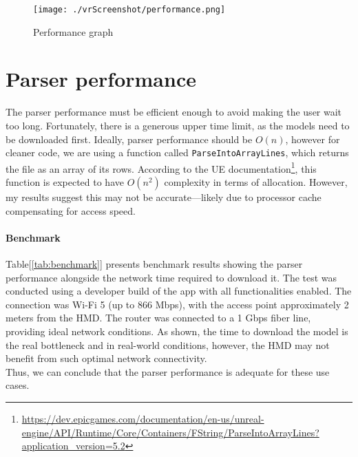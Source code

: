 \begin{figure}[ht]
  \centering
  \texttt{[image: ./vrScreenshot/performance.png]}
  \caption{Performance graph}
  \label{fig:performance}
\end{figure}

\section{Parser performance}\noindent
The parser performance must be efficient enough to avoid making the user wait too long. Fortunately, there is a generous upper time limit, as the models need to be downloaded first.
Ideally, parser performance should be $O(n)$, however for cleaner code, we are using a function called \texttt{ParseIntoArrayLines}, which returns the file as an array of its rows.
According to the \ac{UE} documentation\footnote{\url{https://dev.epicgames.com/documentation/en-us/unreal-engine/API/Runtime/Core/Containers/FString/ParseIntoArrayLines?application_version=5.2}}, this function is expected to have $O(n^2)$ complexity in terms of allocation.
However, my results suggest this may not be accurate—likely due to processor cache compensating for access speed.

\paragraph{Benchmark}
Table[\ref{tab:benchmark}] presents benchmark results showing the parser performance alongside the network time required to download it.
The test was conducted using a developer build of the app with all functionalities enabled. The connection was Wi-Fi 5 (up to 866 Mbps), with the access point approximately 2 meters from the \ac{HMD}.
The router was connected to a 1 Gbps fiber line, providing ideal network conditions.
As shown, the time to download the model is the real bottleneck and in real-world conditions, however, the \ac{HMD} may not benefit from such optimal network connectivity.\\
Thus, we can conclude that the parser performance is adequate for these use cases.

